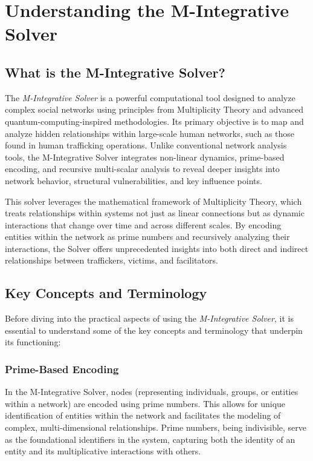 \documentclass[%
 preprint, linenumbers,
 amsmath,amssymb,
 aps, physrev,
]{revtex4-2}
\begin{document}
\section{Understanding the M-Integrative Solver}

\subsection{What is the M-Integrative Solver?}
The \textit{M-Integrative Solver} is a powerful computational tool designed to analyze complex social networks using principles from Multiplicity Theory and advanced quantum-computing-inspired methodologies. Its primary objective is to map and analyze hidden relationships within large-scale human networks, such as those found in human trafficking operations. Unlike conventional network analysis tools, the M-Integrative Solver integrates non-linear dynamics, prime-based encoding, and recursive multi-scalar analysis to reveal deeper insights into network behavior, structural vulnerabilities, and key influence points.

This solver leverages the mathematical framework of Multiplicity Theory, which treats relationships within systems not just as linear connections but as dynamic interactions that change over time and across different scales. By encoding entities within the network as prime numbers and recursively analyzing their interactions, the Solver offers unprecedented insights into both direct and indirect relationships between traffickers, victims, and facilitators.

\subsection{Key Concepts and Terminology}
Before diving into the practical aspects of using the \textit{M-Integrative Solver}, it is essential to understand some of the key concepts and terminology that underpin its functioning:

\subsubsection{Prime-Based Encoding}
In the M-Integrative Solver, nodes (representing individuals, groups, or entities within a network) are encoded using prime numbers. This allows for unique identification of entities within the network and facilitates the modeling of complex, multi-dimensional relationships. Prime numbers, being indivisible, serve as the foundational identifiers in the system, capturing both the identity of an entity and its multiplicative interactions with others.
\end{document}
